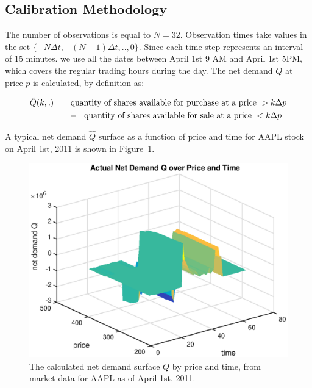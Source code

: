\documentclass{article}
\begin{document}
\subsection{Calibration Methodology}

The number of observations is equal to $N=32$. Observation times take values
in the set $\{-N\Delta t,-(N-1)\Delta t,..,0\}$. Since each time step
represents an interval of 15 minutes. we use all the dates between April 1st
9 AM and April 1st 5PM, which covers the regular trading hours during the
day. The net demand $Q$ at price $p$  is calculated, by definition as:

\begin{gather*}
\hat{Q}(k,.)=\text{quantity of shares available for purchase at a price }>k{%
\Delta p} \\
\text{ \ \ \ \ \ \ \ \ \ }-\text{quantity of shares available for sale at a
price }<k{\Delta p}
\end{gather*}

A typical net demand $\hat{Q}$ surface as a function of price and time for
AAPL stock on April 1st, 2011 is shown in Figure~\ref{fig::AAPL_20110401_Calibration_Q}.

\begin{center}
\begin{figure}[tbp]
\centering
\includegraphics[scale = 0.7]{AAPL_20110401_Calibration_Q.eps}\newline
\caption{The calculated net demand surface $Q$ by price and time, from
market data for AAPL as of April 1st, 2011.}
\label{fig::AAPL_20110401_Calibration_Q}
\end{figure}
\end{center}
\end{document}
